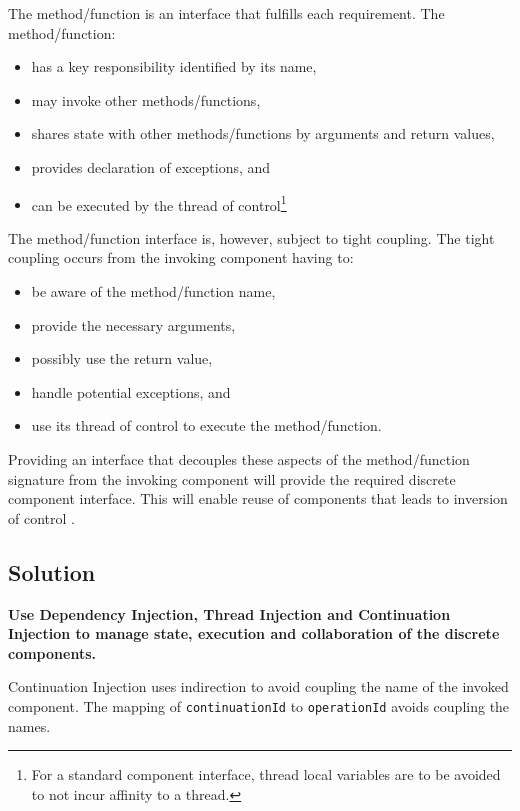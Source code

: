 \documentclass[prodmode]{style/acmlarge}
\begin{document}
The method/function is an interface that fulfills each requirement.  The method/function:
\begin{itemize}
  \item has a key responsibility identified by its name,
  \item may invoke other methods/functions,
  \item shares state with other methods/functions by arguments and return values,
  \item provides declaration of exceptions, and
  \item can be executed by the thread of control\footnote{For a standard component interface, thread local variables are to be avoided to not incur affinity to a thread.}
\end{itemize}

The method/function interface is, however, subject to tight coupling.  The tight
coupling occurs from the invoking component having to:
\begin{itemize}
  \item be aware of the method/function name,
  \item provide the necessary arguments,
  \item possibly use the return value,
  \item handle potential exceptions, and
  \item use its thread of control to execute the method/function.
\end{itemize}

Providing an interface that decouples these aspects of the method/function
signature from the invoking component will provide the required discrete
component interface. This will enable reuse of components that leads to
inversion of control \cite[p. 27]{gof}.


\subsection{Solution}

\textbf{Use Dependency Injection, Thread Injection and Continuation Injection to manage state, execution and collaboration of the discrete components.}

Continuation Injection uses indirection to avoid coupling the name of the
invoked component.  The mapping of \texttt{continuationId} to
\texttt{operationId} avoids coupling the names.
\end{document}
